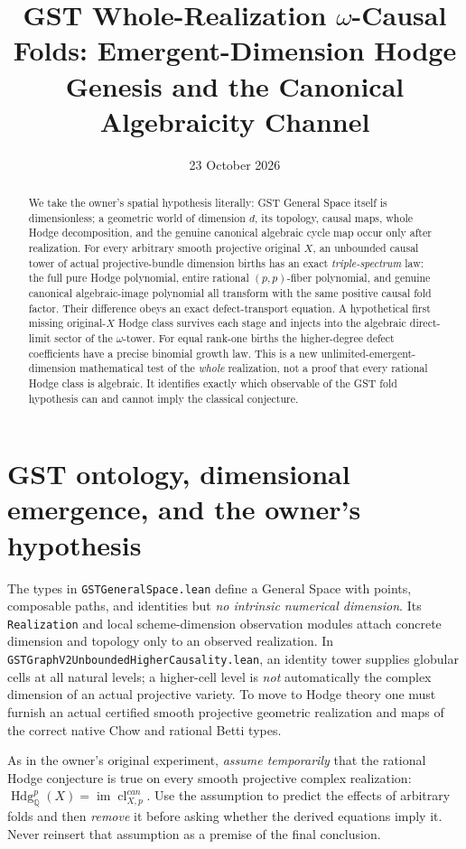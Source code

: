 \documentclass[11pt]{article}
\title{GST Whole-Realization \(\omega\)-Causal Folds: Emergent-Dimension Hodge Genesis and the Canonical Algebraicity Channel}
\date{23 October 2026}
\begin{document}
\maketitle
\begin{abstract}
We take the owner's spatial hypothesis literally: GST General Space itself is dimensionless;
a geometric world of dimension \(d\), its topology, causal maps, whole Hodge decomposition,
and the genuine canonical algebraic cycle map occur only after realization.
For every arbitrary smooth projective original \(X\), an unbounded causal tower
of actual projective-bundle dimension births has an exact \emph{triple-spectrum}
law: the full pure Hodge polynomial, entire rational \((p,p)\)-fiber polynomial,
and genuine canonical algebraic-image polynomial all transform with the same
positive causal fold factor. Their difference obeys an exact defect-transport
equation. A hypothetical first missing original-\(X\) Hodge class survives each
stage and injects into the algebraic direct-limit sector of the \(\omega\)-tower.
For equal rank-one births the higher-degree defect coefficients have a
precise binomial growth law. This is a new unlimited-emergent-dimension
mathematical test of the \emph{whole} realization, not a proof that every
rational Hodge class is algebraic. It identifies exactly which observable
of the GST fold hypothesis can and cannot imply the classical conjecture.
\end{abstract}

\section{GST ontology, dimensional emergence, and the owner's hypothesis}
The types in \texttt{GSTGeneralSpace.lean} define a General Space with points,
composable paths, and identities but \emph{no intrinsic numerical dimension}.
Its \texttt{Realization} and local scheme-dimension observation modules attach
concrete dimension and topology only to an observed realization.
In \texttt{GSTGraphV2UnboundedHigherCausality.lean}, an identity tower
supplies globular cells at all natural levels; a higher-cell level is
\emph{not} automatically the complex dimension of an actual projective variety.
To move to Hodge theory one must furnish an actual certified smooth projective
geometric realization and maps of the correct native Chow and rational Betti types.

As in the owner's original experiment, \emph{assume temporarily}
that the rational Hodge conjecture is true on every smooth projective
complex realization: \(\operatorname{Hdg}^p_{\mathbb Q}(X)=
\operatorname{im}\operatorname{cl}^{can}_{X,p}\).
Use the assumption to predict the effects of arbitrary folds and then
\emph{remove} it before asking whether the derived equations imply it.
Never reinsert that assumption as a premise of the final conclusion.
\end{document}
